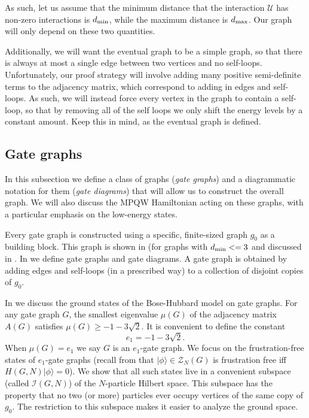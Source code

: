 \documentclass[../thesis-main/thesis-main]{subfiles}
\begin{document}
As such, let us assume that the minimum distance that the interaction $\mathcal{U}$ has non-zero interactions is $d_{\text{min}}$, while the maximum distance is $d_{\text{max}}$.  Our graph will only depend on these two quantities.

Additionally, we will want the eventual graph to be a simple graph, so that there is always at most a single edge between two vertices and no self-loops.  Unfortunately, our proof strategy will involve adding many positive semi-definite terms to the adjacency matrix, which correspond to adding in edges and self-loops.  As such, we will instead force every vertex in the graph to contain a self-loop, so that by removing all of the self loops we only shift the energy levels by a constant amount.  Keep this in mind, as the eventual graph is defined.

\subsection{Gate graphs}

In this subsection we define a class of graphs (\emph{gate graphs}) and a diagrammatic notation for them (\emph{gate diagrams}) that will allow us to construct the overall graph. We will also discuss the MPQW Hamiltonian acting on these graphs, with a particular emphasis on the low-energy states.

Every gate graph is constructed using a specific, finite-sized graph $g_{0}$ as a building block. This graph is shown in  (for graphs with $d_{\text{min}} <= 3$ and discussed in . In  we define gate graphs and gate diagrams. A gate graph is obtained by adding edges and self-loops (in a prescribed way) to a collection of disjoint copies of $g_{0}$.


In  we discuss the ground states of the Bose-Hubbard model on gate graphs. For any gate graph $G$, the smallest eigenvalue $\mu(G)$ of the adjacency matrix $A(G)$ satisfies $\mu(G)\geq-1-3\sqrt{2}$. It is convenient to define the constant
\begin{equation}
e_{1}=-1-3\sqrt{2}.\label{eq:e1_defn}
\end{equation}
When $\mu(G)=e_{1}$ we say $G$ is an $e_{1}$-gate graph. We focus on the frustration-free states of $e_1$-gate graphs (recall from  that $|\phi\rangle\in \mathcal{Z}_N(G)$ is frustration free iff $H(G,N)|\phi\rangle=0$). We show that all such states live in a convenient subspace (called $\mathcal{I}(G,N)$) of the $N$-particle Hilbert space. This subspace has the property that no two (or more) particles ever occupy vertices of the same copy of $g_{0}$. The restriction to this subspace makes it easier to analyze the ground space.
\end{document}
